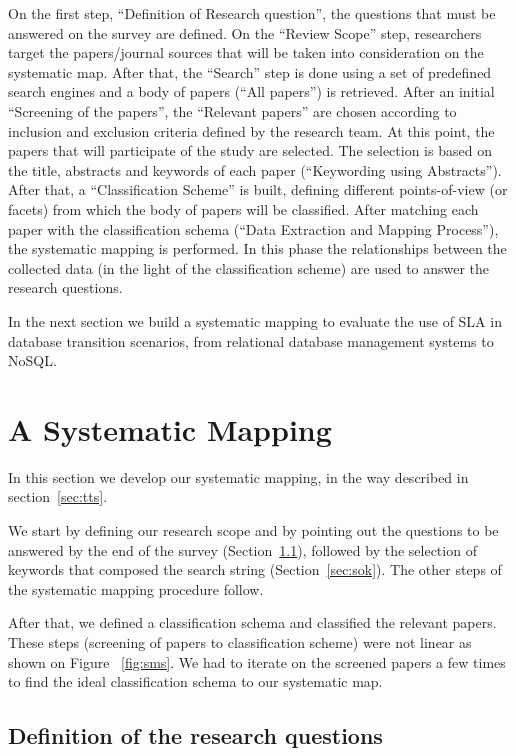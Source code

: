 \documentclass{article}
\begin{document}
On the first step, ``Definition of Research question'', the questions that must be answered on the survey are defined. 
On the ``Review Scope'' step, researchers target the papers/journal sources that will be taken into consideration on the systematic map. 
After that, the ``Search'' step is done using a set of predefined search engines and a body of papers (``All papers'') is retrieved. 
After an initial ``Screening of the papers'', the ``Relevant papers'' are chosen according to inclusion and exclusion criteria defined by the research team. 
At this point, the papers that will participate of the study are selected. 
The selection is based on the title, abstracts and keywords of each paper (``Keywording using Abstracts'').
After that, a ``Classification Scheme'' is built, defining different points-of-view (or facets) from which the body of papers will be classified. 
After matching each paper with the classification schema (``Data Extraction and Mapping Process''), the  systematic mapping is performed.
In this phase the relationships between the collected data (in the light of the classification scheme) are used to answer the research questions.


In the next section we build a systematic mapping to evaluate the use of SLA in database transition scenarios, from relational database management systems to NoSQL.


\section{A Systematic Mapping}
\label{sec:asm}

In this section we develop our systematic mapping, in the way described in section~\ref{sec:tts}.

We start by defining our research scope and by pointing out the questions to be answered by the end of the survey (Section~\ref{sec:drq}), followed by the selection of keywords that composed the search string (Section~\ref{sec:sok}).
The other steps of the systematic mapping procedure follow.

After that, we defined a classification schema and classified the relevant papers. These steps (screening of papers to classification scheme) were not linear as shown on Figure ~\ref{fig:sms}. We had to iterate on the screened papers a few times to find the ideal classification schema to our systematic map.

\subsection{Definition of the research questions}
\label{sec:drq}
\end{document}
